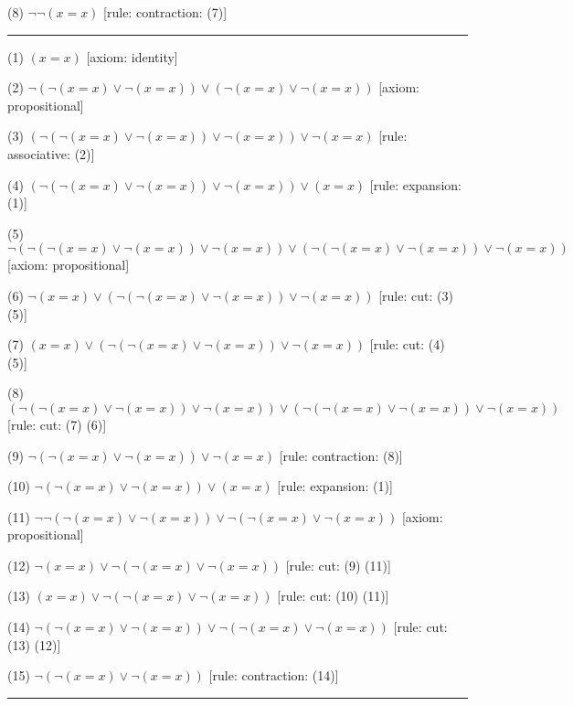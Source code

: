 \item{(8)} $\neg \neg (x = x)$ \hfill [rule: contraction: (7)]
\medskip
\hrule
\medskip
\item{(1)} $(x = x)$ \hfill [axiom: identity]
\item{(2)} $\neg (\neg (x = x) \lor \neg (x = x)) \lor (\neg (x = x) \lor \neg (x = x))$ \hfill [axiom: propositional]
\item{(3)} $(\neg (\neg (x = x) \lor \neg (x = x)) \lor \neg (x = x)) \lor \neg (x = x)$ \hfill [rule: associative: (2)]
\item{(4)} $(\neg (\neg (x = x) \lor \neg (x = x)) \lor \neg (x = x)) \lor (x = x)$ \hfill [rule: expansion: (1)]
\item{(5)} $\neg (\neg (\neg (x = x) \lor \neg (x = x)) \lor \neg (x = x)) \lor (\neg (\neg (x = x) \lor \neg (x = x)) \lor \neg (x = x))$ \hfill [axiom: propositional]
\item{(6)} $\neg (x = x) \lor (\neg (\neg (x = x) \lor \neg (x = x)) \lor \neg (x = x))$ \hfill [rule: cut: (3) (5)]
\item{(7)} $(x = x) \lor (\neg (\neg (x = x) \lor \neg (x = x)) \lor \neg (x = x))$ \hfill [rule: cut: (4) (5)]
\item{(8)} $(\neg (\neg (x = x) \lor \neg (x = x)) \lor \neg (x = x)) \lor (\neg (\neg (x = x) \lor \neg (x = x)) \lor \neg (x = x))$ \hfill [rule: cut: (7) (6)]
\item{(9)} $\neg (\neg (x = x) \lor \neg (x = x)) \lor \neg (x = x)$ \hfill [rule: contraction: (8)]
\item{(10)} $\neg (\neg (x = x) \lor \neg (x = x)) \lor (x = x)$ \hfill [rule: expansion: (1)]
\item{(11)} $\neg \neg (\neg (x = x) \lor \neg (x = x)) \lor \neg (\neg (x = x) \lor \neg (x = x))$ \hfill [axiom: propositional]
\item{(12)} $\neg (x = x) \lor \neg (\neg (x = x) \lor \neg (x = x))$ \hfill [rule: cut: (9) (11)]
\item{(13)} $(x = x) \lor \neg (\neg (x = x) \lor \neg (x = x))$ \hfill [rule: cut: (10) (11)]
\item{(14)} $\neg (\neg (x = x) \lor \neg (x = x)) \lor \neg (\neg (x = x) \lor \neg (x = x))$ \hfill [rule: cut: (13) (12)]
\item{(15)} $\neg (\neg (x = x) \lor \neg (x = x))$ \hfill [rule: contraction: (14)]
\medskip
\hrule
\medskip

